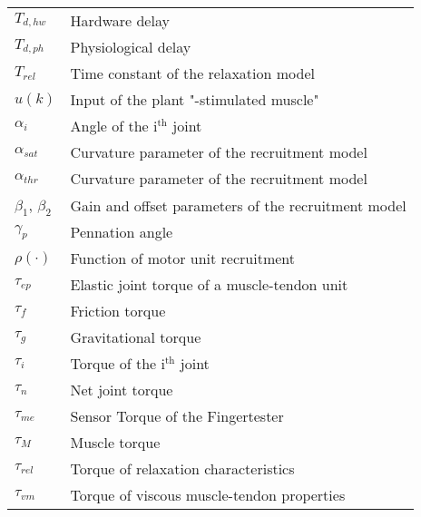 \begin{longtable}[l]{ll}
$T_{d,hw}$							& Hardware delay\\
$T_{d,ph}$							& Physiological delay\\
$T_{rel}$								& Time constant of the relaxation model\\
$u(k)$									& Input of the plant "\rpmsh-stimulated muscle"\\
$\alpha_i$							& Angle of the i$^{\text{th}}$ joint\\
$\alpha_{sat}$					& Curvature parameter of the recruitment model\\
$\alpha_{thr}$					& Curvature parameter of the recruitment model\\
$\beta_1$, $\beta_2$		& Gain and offset parameters of the recruitment model\\ 
$\gamma_{p}$						& Pennation angle\\
$\rho(\cdot)$						& Function of motor unit recruitment\\
$\tau_{ep}$							& Elastic joint torque of a muscle-tendon unit\\
$\tau_f$								& Friction torque\\
$\tau_g$								& Gravitational torque\\
$\tau_i$								& Torque of the i$^{\text{th}}$ joint\\
$\tau_n$								& Net joint torque\\
$\tau_{me}$							& Sensor Torque of the Fingertester\\
$\tau_M$								& Muscle torque\\
$\tau_{rel}$						& Torque of relaxation characteristics\\
$\tau_{vm}$							& Torque of viscous muscle-tendon properties\\
\end{longtable}

